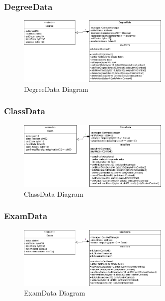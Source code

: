 \subsubsection{DegreeData}
\begin{figure}[!h]
	\centering
	\includegraphics[width=0.65\textwidth]{img/Contracts/DegreeData.png}
	\caption{DegreeData Diagram}
\end{figure}
\subsubsection{ClassData}
\begin{figure}[!h]
	\centering
	\includegraphics[width=0.65\textwidth]{img/Contracts/ClassData.png}
	\caption{ClassData Diagram}
\end{figure}
\subsubsection{ExamData}
\begin{figure}[!h]
	\centering
	\includegraphics[width=0.65\textwidth]{img/Contracts/ExamData.png}
	\caption{ExamData Diagram}
\end{figure}

